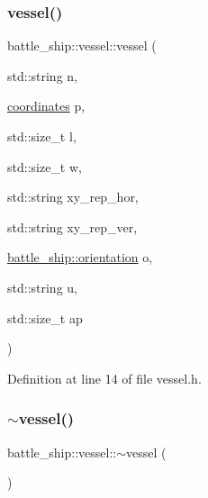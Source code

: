 \mbox{\label{classbattle__ship_1_1vessel_af7546f657ff5bf1daf683d30db034a4f}} 
\subsubsection{\texorpdfstring{vessel()}{vessel()}\hspace{0.1cm}{\footnotesize\ttfamily [2/2]}}
{\footnotesize\ttfamily battle\+\_\+ship\+::vessel\+::vessel (\begin{DoxyParamCaption}\item[{std\+::string}]{n,  }\item[{\hyperlink{structbattle__ship_1_1coordinates}{coordinates}}]{p,  }\item[{std\+::size\+\_\+t}]{l,  }\item[{std\+::size\+\_\+t}]{w,  }\item[{std\+::string}]{xy\+\_\+rep\+\_\+hor,  }\item[{std\+::string}]{xy\+\_\+rep\+\_\+ver,  }\item[{\hyperlink{namespacebattle__ship_aed87488f0a73f0d0679fe343fb61c784}{battle\+\_\+ship\+::orientation}}]{o,  }\item[{std\+::string}]{u,  }\item[{std\+::size\+\_\+t}]{ap }\end{DoxyParamCaption})\hspace{0.3cm}{\ttfamily [inline]}}



Definition at line 14 of file vessel.\+h.

\mbox{\label{classbattle__ship_1_1vessel_a281821b204a7fb93071ef75de5685a37}} 
\subsubsection{\texorpdfstring{$\sim$vessel()}{~vessel()}}
{\footnotesize\ttfamily battle\+\_\+ship\+::vessel\+::$\sim$vessel (\begin{DoxyParamCaption}{ }\end{DoxyParamCaption})\hspace{0.3cm}{\ttfamily [default]}}



